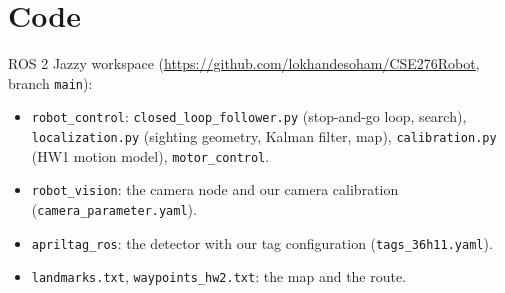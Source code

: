 \documentclass[10pt]{article}
\begin{document}
\section*{Code}
ROS 2 Jazzy workspace (\url{https://github.com/lokhandesoham/CSE276Robot}, branch \texttt{main}):
\begin{itemize}
  \item \texttt{robot\_control}: \texttt{closed\_loop\_follower.py} (stop-and-go loop, search), \texttt{localization.py} (sighting geometry, Kalman filter, map), \texttt{calibration.py} (HW1 motion model), \texttt{motor\_control}.
  \item \texttt{robot\_vision}: the camera node and our camera calibration (\texttt{camera\_parameter.yaml}).
  \item \texttt{apriltag\_ros}: the detector with our tag configuration (\texttt{tags\_36h11.yaml}).
  \item \texttt{landmarks.txt}, \texttt{waypoints\_hw2.txt}: the map and the route.
\end{itemize}
\end{document}
